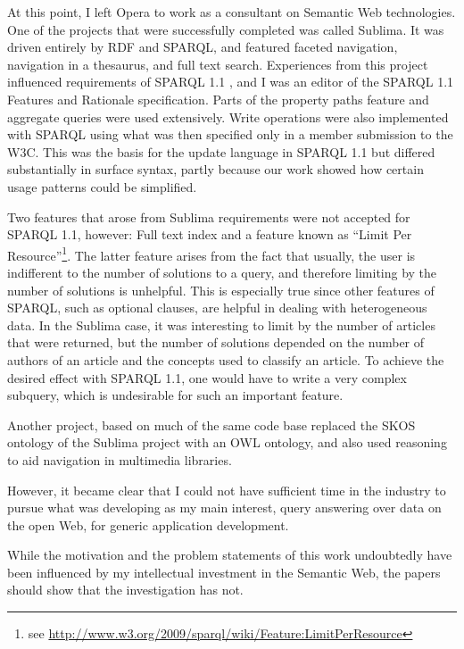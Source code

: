 At this point, I left Opera to work as a consultant on Semantic Web
technologies. One of the projects that were successfully completed was
called Sublima\cite{sublima}. It was driven entirely by RDF and SPARQL,
and featured faceted navigation, navigation in a thesaurus, and full
text search. Experiences from this project influenced requirements of
SPARQL 1.1 \cite{sparql11query}, and I was an editor of the SPARQL 1.1 Features and
Rationale specification\cite{sparql11new}. Parts of the property paths
feature and aggregate queries were used extensively. Write operations
were also implemented with SPARQL using what was then specified only
in a member submission to the W3C\cite{seaborne2008sparql}. This was the basis for
the update language in SPARQL 1.1 but differed substantially in
surface syntax, partly because our work showed how certain usage patterns
could be simplified. 

Two features that arose from Sublima requirements were not accepted
for SPARQL 1.1, however: Full text index and a feature known as
``Limit Per Resource''\footnote{see
  \url{http://www.w3.org/2009/sparql/wiki/Feature:LimitPerResource}}. The
latter feature arises from the fact that usually, the user is
indifferent to the number of solutions to a query, and therefore
limiting by the number of solutions is unhelpful. This is especially
true since other features of SPARQL, such as optional clauses, are
helpful in dealing with heterogeneous data. In the Sublima case, it
was interesting to limit by the number of articles that were returned,
but the number of solutions depended on the number of authors of an
article and the concepts used to classify an article. To achieve the
desired effect with SPARQL 1.1, one would have to write a very complex
subquery, which is undesirable for such an important feature.


Another project, based on much of the same code
base replaced the SKOS ontology of the Sublima project with an OWL
ontology, and also used reasoning to aid navigation in multimedia
libraries.



However, it became clear that I could not have sufficient time in the
industry to pursue what was developing as my main interest, query
answering over data on the open Web, for generic application
development. 

While the motivation and the problem statements of this work
undoubtedly have been influenced by my intellectual investment in the
Semantic Web, the papers should show that the investigation has not.

